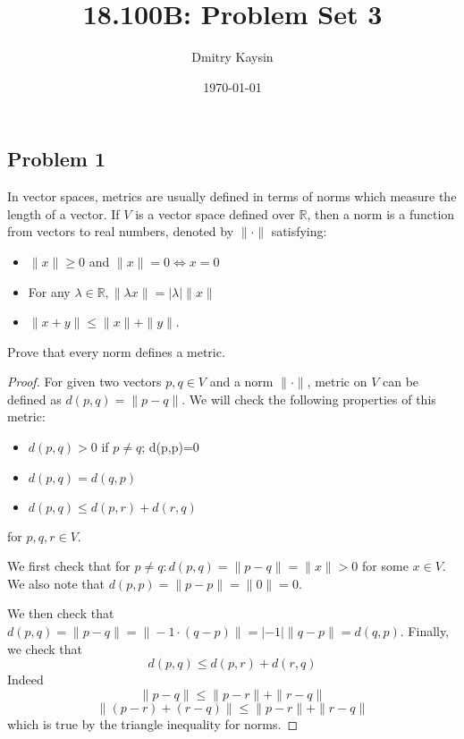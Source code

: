 \documentclass{article}
\title{18.100B: Problem Set 3}
\author{Dmitry Kaysin}
\date\today
\begin{document}
\maketitle 

\subsection*{Problem 1}

\begin{tcolorbox}
In vector spaces, metrics are usually defined in terms of norms which measure the length
of a vector. If $V$ is a vector space defined over $\mathbb{R}$, then a norm is a function from vectors to real
numbers, denoted by $\| \cdot \|$ satisfying:\\
\begin{itemize}
    \item $\|x\| \geq 0$ and $\|x\|=0 \iff x = 0$
    \item For any $\lambda \in \mathbb{R}, \| \lambda x\| = | \lambda | \| x \| $
    \item $\| x+y \| \leq \|x\| + \|y \|$.
\end{itemize}
Prove that every norm defines a metric.
\end{tcolorbox}

\begin{proof}

For given two vectors $p, q \in V$ and a norm $\| \cdot \|$, metric on $V$ can be defined as $d(p, q) = \| p-q \|$. We will check the following properties of this metric:
\begin{itemize}
    \item $d(p, q) > 0$ if $p \neq q$; d(p,p)=0
    \item $d(p, q) = d(q, p)$
    \item $d(p, q) \leq d(p, r) + d(r, q)$
\end{itemize}
for $p, q, r \in V$.

We first check that for $p \neq q : d(p, q) = \| p-q \| = \| x \| > 0$ for some $x \in V$. We also note that $d(p, p) = \| p-p \| = \| 0 \| = 0$.

We then check that $d(p, q) = \| p-q \| = \| -1 \cdot (q-p) \| = |-1| \| q-p \| = d (q, p)$.
Finally, we check that 
$$d(p, q) \leq d(p, r) + d(r, q)$$
Indeed
$$\| p-q \| \leq \| p-r \| + \| r-q \|$$ 
$$\| (p-r) + (r-q) \| \leq \| p-r \| + \| r-q \|$$ 
which is true by the triangle inequality for norms.

\end{proof}
\end{document}
